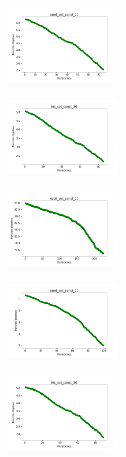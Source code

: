 \begin{figure}[H]
\begin{subfigure}
    \end{subfigure}
    \hfill
    \begin{subfigure}
        \centering
        \includegraphics[width=0.32\textwidth]{img/bl/rand_set_const_20_589741062_cost.png}
    \end{subfigure}
    \hfill
    \begin{subfigure}
        \centering
        \includegraphics[width=0.32\textwidth]{img/bl/iris_set_const_20_277451237_cost.png}
    \end{subfigure}
    \hfill
    \begin{subfigure}
        \centering
        \includegraphics[width=0.32\textwidth]{img/bl/ecoli_set_const_20_277451237_cost.png}
    \end{subfigure}
    \hfill
    \begin{subfigure}
        \centering
        \includegraphics[width=0.32\textwidth]{img/bl/rand_set_const_20_277451237_cost.png}
    \end{subfigure}
    \hfill
    \begin{subfigure}
        \centering
        \includegraphics[width=0.32\textwidth]{img/bl/iris_set_const_20_49258669_cost.png}

\end{subfigure}
\end{figure}
